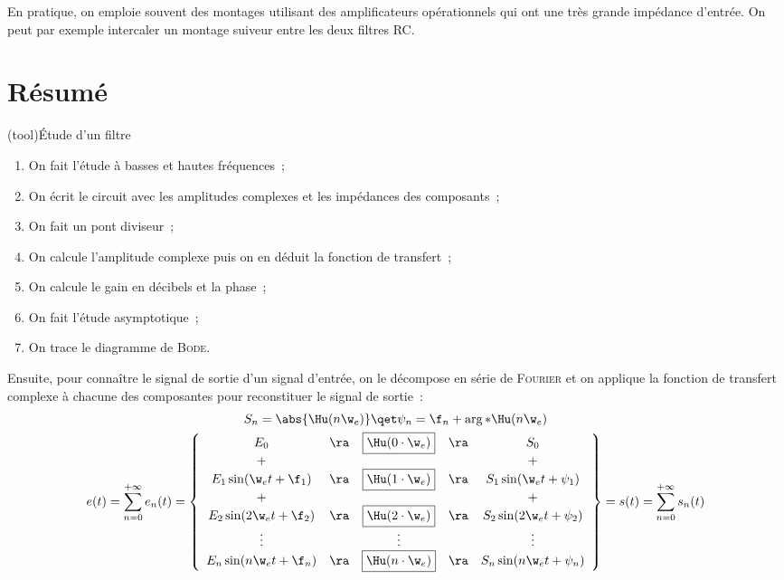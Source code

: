\documentclass[../../main/main.tex]{subfiles}
\begin{document}
En pratique, on emploie souvent des montages utilisant des amplificateurs
opérationnels qui ont une très grande impédance d'entrée. On peut par exemple
intercaler un montage suiveur entre les deux filtres RC.

\section{Résumé}
\begin{tcb*}[breakable](tool){Étude d'un filtre}
	\begin{enumerate}
		\item On fait l'étude à basses et hautes fréquences~;
		\item On écrit le circuit avec les amplitudes complexes et les impédances des
		      composants~;
		\item On fait un pont diviseur~;
		\item On calcule l'amplitude complexe puis on en déduit la fonction de
		      transfert~;
		\item On calcule le gain en décibels et la phase~;
		\item On fait l'étude asymptotique~;
		\item On trace le diagramme de \textsc{Bode}.
	\end{enumerate}
	Ensuite, pour connaître le signal de sortie d'un signal d'entrée, on le
	décompose en série de \textsc{Fourier} et on applique la fonction de transfert
	complexe à chacune des composantes pour reconstituer le signal de sortie~:
	\begin{gather*}
		S_n = \abs{\Hu(n\w_e)}
		\qet
		\psi_n = \f_n + \arg*{\Hu(n\w_e)}
		\\
		e(t) = \sum_{n=0}^{+\infty} e_n(t) =
		\left\{
		\begin{array}{ccccc}
			E_0                     & \ra & \fbox{$\Hu(0\cdot\w_e)$} & \ra & S_0
			\\
			+                       &     &                          &     & +
			\\
			E_1\sin(\w_e t + \f_1)  & \ra & \fbox{$\Hu(1\cdot\w_e)$} & \ra & S_1\sin(\w_e t + \psi_1)
			\\
			+                       &     &                          &     & +
			\\
			E_2\sin(2\w_e t + \f_2) & \ra & \fbox{$\Hu(2\cdot\w_e)$} & \ra & S_2\sin(2\w_e t + \psi_2)
			\\
			\vdots                  &     & \vdots                   &     & \vdots
			\\
			E_n\sin(n\w_e t + \f_n) & \ra & \fbox{$\Hu(n\cdot\w_e)$} & \ra & S_n\sin(n\w_e t + \psi_n)
		\end{array}
		\right\} = s(t) = \sum_{n=0}^{+\infty}s_n(t)
	\end{gather*}
\end{tcb*}

\vspace*{-15pt}
\end{document}
